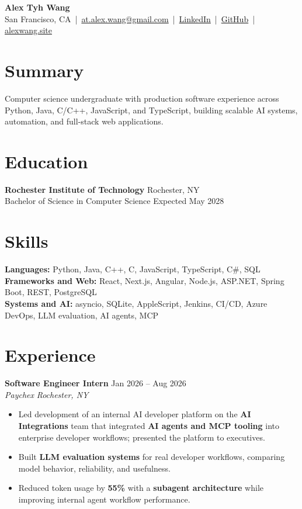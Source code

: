 \documentclass[10pt,letterpaper]{article}
\newcommand{\resumeRole}[4]{%
  \textbf{#1} \hfill #2\\
  \textit{#3} \hfill \textit{#4}
}
\newcommand{\majorGap}{\vspace{1pt plus 2fill}}
\begin{document}
\begin{center}
{\Large \textbf{Alex Tyh Wang}}\\
San Francisco, CA \,|\, \href{mailto:at.alex.wang@gmail.com}{at.alex.wang@gmail.com} \,|\, \href{https://www.linkedin.com/in/alex-tyh-wang/}{LinkedIn} \,|\, \href{https://github.com/alextyhwang}{GitHub} \,|\, \href{https://alexwang.site}{alexwang.site}
\end{center}

\section*{Summary}
Computer science undergraduate with production software experience across Python, Java, C/C++, JavaScript, and TypeScript, building scalable AI systems, automation, and full-stack web applications.

\majorGap
\section*{Education}
\textbf{Rochester Institute of Technology} \hfill Rochester, NY\\
Bachelor of Science in Computer Science \hfill Expected May 2028

\majorGap
\section*{Skills}
\textbf{Languages:} Python, Java, C++, C, JavaScript, TypeScript, C\#, SQL\\
\textbf{Frameworks and Web:} React, Next.js, Angular, Node.js, ASP.NET, Spring Boot, REST, PostgreSQL\\
\textbf{Systems and AI:} asyncio, SQLite, AppleScript, Jenkins, CI/CD, Azure DevOps, LLM evaluation, AI agents, MCP

\majorGap
\section*{Experience}
\resumeRole{Software Engineer Intern}{Jan 2026 -- Aug 2026}{Paychex}{Rochester, NY}
\begin{itemize}
  \item Led development of an internal AI developer platform on the \textbf{AI Integrations} team that integrated \textbf{AI agents and MCP tooling} into enterprise developer workflows; presented the platform to executives.
  \item Built \textbf{LLM evaluation systems} for real developer workflows, comparing model behavior, reliability, and usefulness.
  \item Reduced token usage by \textbf{55\%} with a \textbf{subagent architecture} while improving internal agent workflow performance.
\end{itemize}
\end{document}
